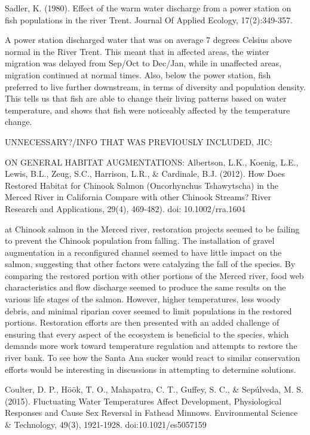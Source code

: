 \documentclass{article}
\begin{document}
Sadler, K. (1980). Effect of the warm water discharge from a power station on fish populations in the river Trent. Journal Of Applied Ecology, 17(2):349-357.

A power station discharged water that was on average 7 degrees Celsius above normal in the River Trent. This meant that in affected areas, the winter migration was delayed from Sep/Oct to Dec/Jan, while in unaffected areas, migration continued at normal times. Also, below the power station, fish preferred to live further downstream, in terms of diversity and population density. This tells us that fish are able to change their living patterns based on water temperature, and shows that fish were noticeably affected by the temperature change. 


UNNECESSARY?/INFO THAT WAS PREVIOUSLY INCLUDED, JIC:

ON GENERAL HABITAT AUGMENTATIONS: Albertson, L.K., Koenig, L.E., Lewis, B.L., Zeug, S.C., Harrison, L.R., \& Cardinale, B.J. (2012). How Does Restored Habitat for Chinook Salmon (Oncorhynchus Tshawytscha) in the Merced River in California Compare with other Chinook Streams? River Research and Applications, 29(4), 469-482). doi: 10.1002/rra.1604

at Chinook salmon in the Merced river, restoration projects seemed to be failing to prevent the Chinook population from falling. The installation of gravel augmentation in a reconfigured channel seemed to have little impact on the salmon, suggesting that other factors were catalyzing the fall of the species. 
By comparing the restored portion with other portions of the Merced river, food web characteristics and flow discharge seemed to produce the same results on the various life stages of the salmon. However, higher temperatures, less woody debris, and minimal riparian cover seemed to limit populations in the restored portions. 
Restoration efforts are then presented with an added challenge of ensuring that every aspect of the ecosystem is beneficial to the species, which demands more work toward temperature regulation and attempts to restore the river bank. 
To see how the Santa Ana sucker would react to similar conservation efforts would be interesting in discussions in attempting to determine solutions. 

Coulter, D. P., Höök, T. O., Mahapatra, C. T., Guffey, S. C., \& Sepúlveda, M. S. (2015). Fluctuating Water Temperatures Affect Development, Physiological Responses and Cause Sex Reversal in Fathead Minnows. Environmental Science \& Technology, 49(3), 1921-1928. doi:10.1021/es5057159
\end{document}
